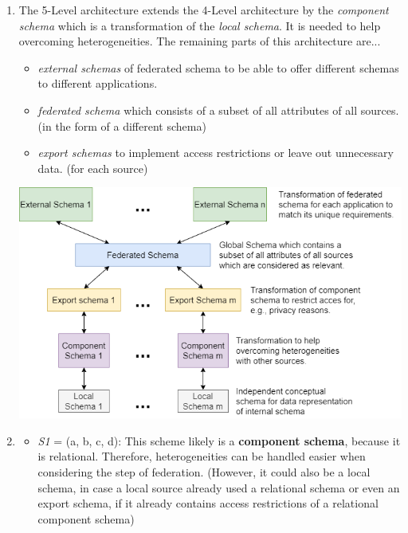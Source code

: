 \documentclass{scrartcl}
\begin{document}
	\begin{enumerate}
		\item The 5-Level architecture extends the 4-Level architecture by the \textit{component schema} which is a transformation of the \textit{local schema}.
		It is needed to help overcoming heterogeneities.
		The remaining parts of this architecture are...
		\begin{itemize}
			\item \textit{external schemas} of federated schema to be able to offer different schemas to different applications.
			\item \textit{federated schema} which consists of a subset of all attributes of all sources. (in the form of a different schema)
			\item \textit{export schemas} to implement access restrictions or leave out unnecessary data. (for each source)
		\end{itemize}
		\begin{center}
			\hspace*{-1.5cm}
			\includegraphics[width=1.1\textwidth]{figures/Task3_a_Visualization.png}
		\end{center}
	
		\item\phantom{phantom}
		\begin{itemize}
			\item \textit{S1} = (a, b, c, d): This scheme likely is a \textbf{component schema}, because it is relational.
			Therefore, heterogeneities can be handled easier when considering the step of federation.
			(However, it could also be a local schema, in case a local source already used a relational schema or even an export schema, if it already contains access restrictions of a relational component schema)
			

\end{itemize}
\end{enumerate}
\end{document}
